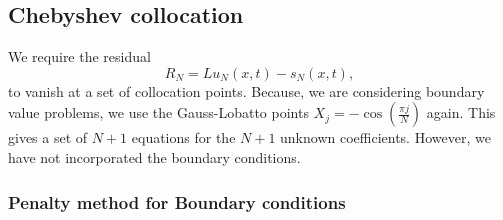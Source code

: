 \subsection{Chebyshev collocation}

We require the residual 
\begin{equation} R_N= Lu_N(x,t)-s_N(x,t), \end{equation}
to vanish at a set of collocation points. Because, we are considering boundary value problems, we use the Gauss-Lobatto points $X_j=-\cos (\frac{\pi j}{N})$ again. This gives a set of $N+1$ equations for the $N+1$ unknown coefficients. However, we have not incorporated the boundary conditions.

\subsubsection{Penalty method for Boundary conditions}

